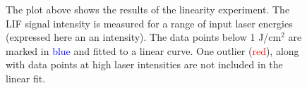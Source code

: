 \begin{figure}

\centering



\caption[Results of the linearity experiment]{The plot above shows the results of the linearity experiment. The LIF signal intensity is measured for a range of input laser energies (expressed here an an intensity). The data points below 1 J/cm\(^2\) are marked in \textcolor{blue}{blue} and fitted to a linear curve. One outlier (\textcolor{red}{red}), along with data points at high laser intensities are not included in the linear fit.}

\label{fig:linearityResults}

\end{figure}

